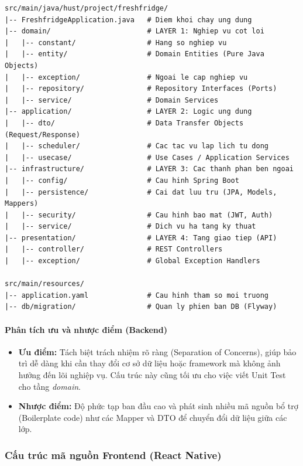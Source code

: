 \begin{verbatim}
src/main/java/hust/project/freshfridge/
|-- FreshfridgeApplication.java   # Diem khoi chay ung dung
|-- domain/                       # LAYER 1: Nghiep vu cot loi
|   |-- constant/                 # Hang so nghiep vu
|   |-- entity/                   # Domain Entities (Pure Java Objects)
|   |-- exception/                # Ngoai le cap nghiep vu
|   |-- repository/               # Repository Interfaces (Ports)
|   |-- service/                  # Domain Services
|-- application/                  # LAYER 2: Logic ung dung
|   |-- dto/                      # Data Transfer Objects (Request/Response)
|   |-- scheduler/                # Cac tac vu lap lich tu dong
|   |-- usecase/                  # Use Cases / Application Services
|-- infrastructure/               # LAYER 3: Cac thanh phan ben ngoai
|   |-- config/                   # Cau hinh Spring Boot
|   |-- persistence/              # Cai dat luu tru (JPA, Models, Mappers)
|   |-- security/                 # Cau hinh bao mat (JWT, Auth)
|   |-- service/                  # Dich vu ha tang ky thuat
|-- presentation/                 # LAYER 4: Tang giao tiep (API)
|   |-- controller/               # REST Controllers
|   |-- exception/                # Global Exception Handlers

src/main/resources/
|-- application.yaml              # Cau hinh tham so moi truong
|-- db/migration/                 # Quan ly phien ban DB (Flyway)
\end{verbatim}

\paragraph{Phân tích ưu và nhược điểm (Backend)}
\begin{itemize}
    \item \textbf{Ưu điểm:} Tách biệt trách nhiệm rõ ràng (Separation of Concerns), giúp bảo trì dễ dàng khi cần thay đổi cơ sở dữ liệu hoặc framework mà không ảnh hưởng đến lõi nghiệp vụ. Cấu trúc này cũng tối ưu cho việc viết Unit Test cho tầng \textit{domain}.
    \item \textbf{Nhược điểm:} Độ phức tạp ban đầu cao và phát sinh nhiều mã nguồn bổ trợ (Boilerplate code) như các Mapper và DTO để chuyển đổi dữ liệu giữa các lớp.
\end{itemize}

\subsubsection{Cấu trúc mã nguồn Frontend (React Native)}

